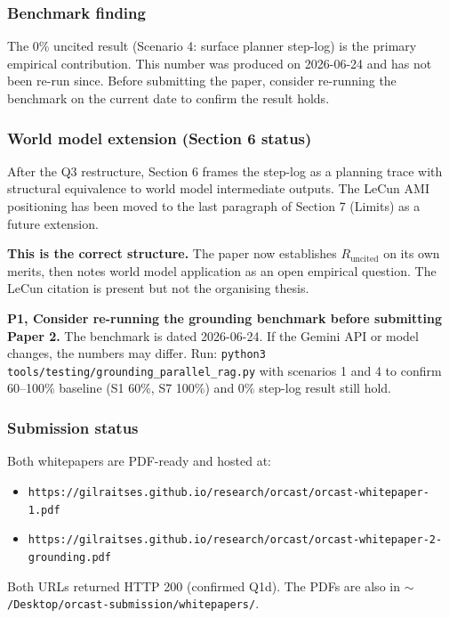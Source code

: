 \subsubsection{Benchmark finding}

The 0\% uncited result (Scenario 4: surface planner step-log) is the primary empirical contribution. This number was produced on 2026-06-24 and has not been re-run since. Before submitting the paper, consider re-running the benchmark on the current date to confirm the result holds.

\subsubsection{World model extension (Section 6 status)}

After the Q3 restructure, Section 6 frames the step-log as a planning trace with structural equivalence to world model intermediate outputs. The LeCun AMI positioning has been moved to the last paragraph of Section 7 (Limits) as a future extension.

\begin{notebox}
\textbf{This is the correct structure.} The paper now establishes $R_\text{uncited}$ on its own merits, then notes world model application as an open empirical question. The LeCun citation is present but not the organising thesis.
\end{notebox}

\begin{p1box}
\textbf{P1, Consider re-running the grounding benchmark before submitting Paper 2.} The benchmark is dated 2026-06-24. If the Gemini API or model changes, the numbers may differ. Run: \texttt{python3 tools/testing/grounding\_parallel\_rag.py} with scenarios 1 and 4 to confirm 60--100\% baseline (S1 60\%, S7 100\%) and 0\% step-log result still hold.
\end{p1box}

\subsubsection{Submission status}

Both whitepapers are PDF-ready and hosted at:
\begin{itemize}
\item \texttt{https://gilraitses.github.io/research/orcast/orcast-whitepaper-1.pdf}
\item \texttt{https://gilraitses.github.io/research/orcast/orcast-whitepaper-2-grounding.pdf}
\end{itemize}
Both URLs returned HTTP 200 (confirmed Q1d). The PDFs are also in \texttt{$\sim$/Desktop/orcast-submission/whitepapers/}.
